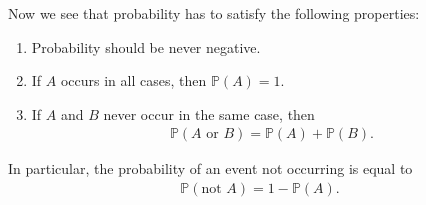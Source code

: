\documentclass[9pt]{beamer}
\begin{document}
\begin{frame}[fragile,t] %
 Now we see that probability has to satisfy the following properties: \pause

 \begin{enumerate}
   \item Probability should be never negative.
   \item If $A$ occurs in all cases, then  $ \mathbb{P}(A)=1$.
   \item If $A$ and $B$ never occur in the same case, then
     \begin{align*}
       \mathbb{P}\left(\text{$A$ or  $B$}\right) = \mathbb{P}(A) + \mathbb{P}(B).
     \end{align*}
 \end{enumerate}
 \vfill \pause

 In particular, the probability of an event not occurring is equal to
 \begin{align*}
   \mathbb{P}(\text{not $A$})  = 1 - \mathbb{P}(A).
 \end{align*}

\end{frame}
\end{document}
